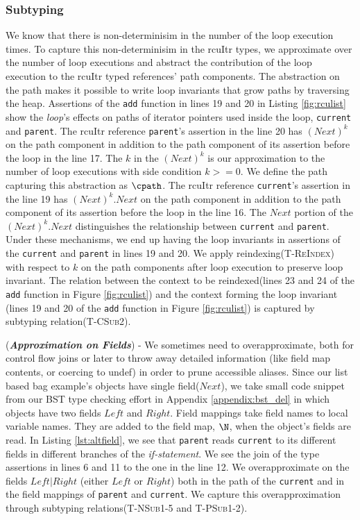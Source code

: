 \subsubsection{Subtyping}
We know that there is non-determinisim in the number of the loop execution times. To capture this non-determinisim in the \textsf{rcuItr} types, we approximate over the number of loop executions and abstract the contribution of the loop execution to the \textsf{rcuItr} typed references' path components. The abstraction on the path  makes it possible to write loop invariants that grow paths by traversing the heap. Assertions of the \texttt{add} function in lines 19 and 20 in Listing \ref{fig:rculist} show the \textit{loop}'s effects on paths of iterator pointers used inside the loop, \texttt{current} and \texttt{parent}. The \textsf{rcuItr} reference \texttt{parent}'s assertion in the line 20 has $(Next)^{k}$ on the path component in addition to the path component of its assertion before the loop in the line 17. The $k$ in the $(Next)^{k}$ is our approximation to the number of loop executions with side condition $k>=0$. We define the path capturing this abstraction as $\cpath$. The \textsf{rcuItr} reference \texttt{current}'s assertion in the line 19 has $(Next)^{k}.Next$ on the path component in addition to the path component of its assertion before the loop in the line 16. The $Next$ portion of the $(Next)^{k}.Next$ distinguishes the relationship between \texttt{current} and \texttt{parent}. Under these mechanisms, we end up having the loop invariants in  assertions of the \texttt{current} and \texttt{parent} in lines 19 and 20. We apply reindexing(\textsc{T-ReIndex}) with respect to $k$ on the path components after loop execution to preserve loop invariant. The relation between the context to be reindexed(lines 23 and 24 of the \texttt{add} function in Figure \ref{fig:rculist}) and the context forming the loop invariant (lines 19 and 20 of the \texttt{add} function in Figure \ref{fig:rculist}) is captured by subtyping relation(\textsc{T-CSub2}).

(\textit{\textbf{Approximation on Fields}}) - We sometimes need to overapproximate, both for control flow joins or later to throw away detailed information (like field map contents, or coercing to undef) in order to prune accessible aliases. Since our list based bag example's objects have single field($Next$), we take small code snippet from our \textsf{BST} type checking effort in Appendix \ref{appendix:bst_del} in which objects have two fields $Left$ and $Right$. Field mappings take field names to local variable names. They are added to the field map, $\N$, when the object's fields are read. In Listing \ref{lst:altfield}, we see that \texttt{parent} reads \texttt{current} to its different fields in different branches of the \textit{if-statement}. We see the join of the type assertions in lines 6 and 11 to the one in the line 12. We overapproximate on the fields $Left|Right$ (either $Left$ or $Right$) both in the path of the \texttt{current} and in the field mappings of \texttt{parent} and \texttt{current}. We capture this overapproximation through subtyping relations(\textsc{T-NSub1-5} and \textsc{T-PSub1-2}).

